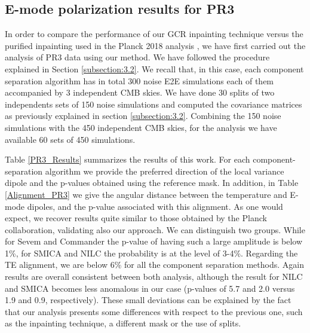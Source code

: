{\subsection{E-mode polarization results for PR3}

In order to compare the performance of our GCR inpainting technique versus the purified inpainting used in the Planck 2018 analysis \cite{Planck:2019evm}, we have first carried out the analysis of PR3 data using our method.
We have followed the procedure explained in Section \ref{subsection:3.2}. We recall that, in this case, each component separation algorithm has in total 300 noise E2E simulations each of them accompanied by 3 independent CMB skies. We have done 30 splits of two independents sets of 150 noise simulations and computed the covariance matrices as previously explained in section \ref{subsection:3.2}. Combining the 150 noise simulations with the 450 independent CMB skies, for the analysis we have available 60 sets of 450 simulations. 

Table \ref{PR3_Results} summarizes the results of this work. For each component-separation algorithm we provide the preferred direction of the local variance dipole and the p-values obtained using the reference mask. In addition, in Table \ref{Alignment_PR3} we give the angular distance between the temperature and E-mode dipoles, and the p-value associated with this alignment. 
As one would expect, we recover results quite similar to those obtained by the Planck collaboration, validating also our approach. We can distinguish two groups. While for Sevem and Commander the p-value of having such a large amplitude is below 1\%, for SMICA and NILC the probability is at the level of 3-4\%. Regarding the TE alignment, we are below 6\% for all the component separation methods. 
Again results are overall consistent between both analysis, although the result for NILC and SMICA becomes less anomalous in our case (p-values of 5.7 and 2.0 versus 1.9 and 0.9, respectively). These small deviations can be explained by the fact that our analysis presents some differences with respect to the previous one, such as the inpainting technique, a different mask or the use of splits.

}
